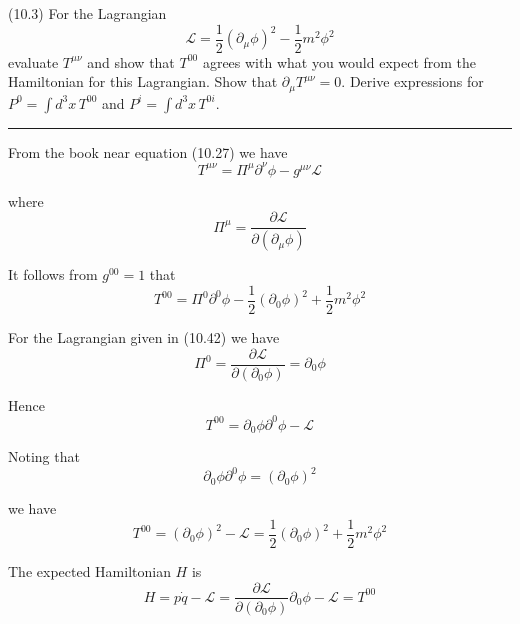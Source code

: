 \documentclass[12pt]{article}
\begin{document}
(10.3)
For the Lagrangian
\begin{equation*}
\mathcal L=\frac{1}{2}(\partial_\mu\phi)^2-\frac{1}{2}m^2\phi^2
\tag{10.42}
\end{equation*}
evaluate $T^{\mu\nu}$ and show that $T^{00}$ agrees with what
you would expect from the Hamiltonian for this Lagrangian.
Show that $\partial_\mu T^{\mu\nu}=0$. Derive expressions
for $P^0=\int d^3x\,T^{00}$ and $P^i=\int d^3x\,T^{0i}$.

\bigskip
\hrule

\bigskip
From the book near equation (10.27) we have
\begin{equation*}
T^{\mu\nu}=\Pi^\mu\partial^\nu\phi-g^{\mu\nu}\mathcal L
\end{equation*}

where
\begin{equation*}
\Pi^\mu=\frac{\partial\mathcal L}{\partial(\partial_\mu\phi)}
\end{equation*}

It follows from $g^{00}=1$ that
\begin{equation*}
T^{00}=\Pi^0\partial^0\phi-\frac{1}{2}(\partial_0\phi)^2+\frac{1}{2}m^2\phi^2
\end{equation*}

For the Lagrangian given in (10.42) we have
\begin{equation*}
\Pi^0=\frac{\partial\mathcal L}{\partial(\partial_0\phi)}=\partial_0\phi
\end{equation*}

Hence
\begin{equation*}
T^{00}=\partial_0\phi\partial^0\phi-\mathcal L
\end{equation*}

Noting that
\begin{equation*}
\partial_0\phi\partial^0\phi=(\partial_0\phi)^2
\end{equation*}

we have
\begin{equation*}
T^{00}=(\partial_0\phi)^2-\mathcal L=\frac{1}{2}(\partial_0\phi)^2+\frac{1}{2}m^2\phi^2
\end{equation*}

The expected Hamiltonian $H$ is
\begin{equation*}
H=p\dot q-\mathcal L
=\frac{\partial\mathcal L}{\partial(\partial_0\phi)}\partial_0\phi-\mathcal L
=T^{00}
\end{equation*}
\end{document}
